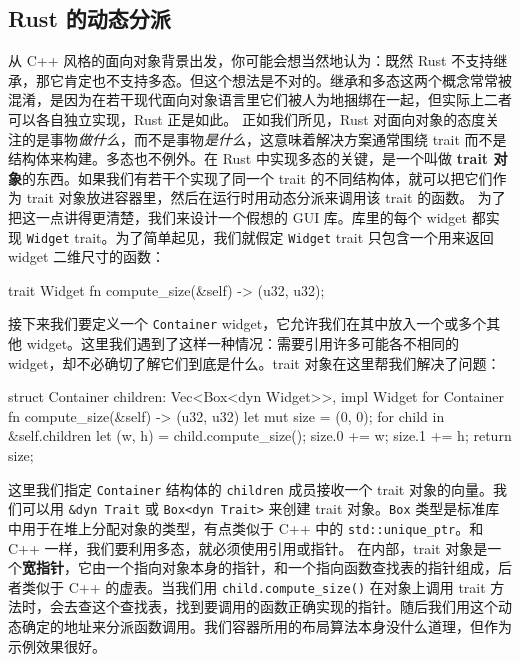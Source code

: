 \subsection{Rust 的动态分派}
\label{idx:idx_879ff879}
从 C++ 风格的面向对象背景出发，你可能会想当然地认为：既然 Rust 不支持继承，那它肯定也不支持多态。但这个想法是不对的。继承和多态这两个概念常常被混淆，是因为在若干现代面向对象语言里它们被人为地捆绑在一起，但实际上二者可以各自独立实现，Rust 正是如此。
\label{idx:idx_f157c90b}
正如我们所见，Rust 对面向对象的态度关注的是事物\emph{做什么}，而不是事物\emph{是什么}，这意味着解决方案通常围绕 trait 而不是结构体来构建。多态也不例外。在 Rust 中实现多态的关键，是一个叫做 \textbf{trait 对象}的东西。如果我们有若干个实现了同一个 trait 的不同结构体，就可以把它们作为 trait 对象放进容器里，然后在运行时用动态分派来调用该 trait 的函数。
为了把这一点讲得更清楚，我们来设计一个假想的 GUI 库。库里的每个 widget 都实现 \texttt{Widget} trait。为了简单起见，我们就假定 \texttt{Widget} trait 只包含一个用来返回 widget 二维尺寸的函数：
\begin{codebox}[rust]
trait Widget {
      fn compute_size(&self) -> (u32, u32);
}
\end{codebox}
接下来我们要定义一个 \texttt{Container} widget，它允许我们在其中放入一个或多个其他 widget。这里我们遇到了这样一种情况：需要引用许多可能各不相同的 widget，却不必确切了解它们到底是什么。trait 对象在这里帮我们解决了问题：
\begin{codebox}[rust]
struct Container {
      children: Vec<Box<dyn Widget>>,
}
impl Widget for Container {
      fn compute_size(&self) -> (u32, u32) {
            let mut size = (0, 0);
            for child in &self.children {
                  let (w, h) = child.compute_size();
                  size.0 += w;
                  size.1 += h;
            }
        return size;
    }
}
\end{codebox}
\label{idx:idx_98a0ea1e}
这里我们指定 \texttt{Container} 结构体的 \texttt{children} 成员接收一个 trait 对象的向量。我们可以用 \texttt{\&dyn Trait} 或 \texttt{Box<\allowbreak{}dyn Trait>\allowbreak{}} 来创建 trait 对象。\texttt{Box} 类型是标准库中用于在堆上分配对象的类型，有点类似于 C++ 中的 \texttt{std::\allowbreak{}unique\_\allowbreak{}ptr}。和 C++ 一样，我们要利用多态，就必须使用引用或指针。
在内部，trait 对象是一个\textbf{宽指针}，它由一个指向对象本身的指针，和一个指向函数查找表的指针组成，后者类似于 C++ 的虚表。当我们用 \texttt{child.\allowbreak{}compute\_\allowbreak{}size(\allowbreak{})\allowbreak{}} 在对象上调用 trait 方法时，会去查这个查找表，找到要调用的函数正确实现的指针。随后我们用这个动态确定的地址来分派函数调用。我们容器所用的布局算法本身没什么道理，但作为示例效果很好。
